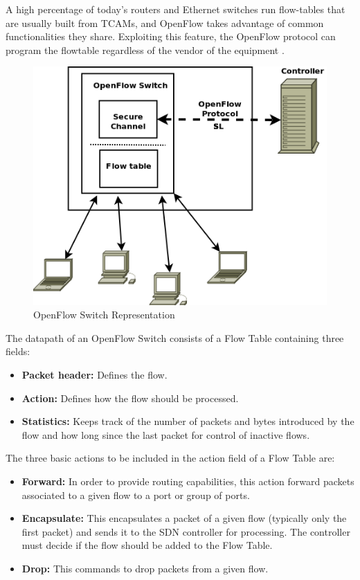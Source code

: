 A high percentage of today's routers and Ethernet switches run flow-tables that are usually built from TCAMs, and OpenFlow takes advantage of common functionalities they share. Exploiting this feature, the OpenFlow protocol can program the flowtable regardless of the vendor of the equipment \cite{of_campus_net}.

\begin{center}
\begin{figure}[h!]
  \centering
    \includegraphics[scale=0.55]{./images/OpenFlowSwitch}
	\caption{OpenFlow Switch Representation}
	\label{openflowswitch-fig}
\end{figure}
\end{center}

The datapath of an OpenFlow Switch consists of a Flow Table containing three fields:

\begin{itemize}
\item{\textbf{Packet header:} Defines the flow.}
\item{\textbf{Action:} Defines how the flow should be processed.} 
\item{\textbf{Statistics:} Keeps track of the number of packets and bytes introduced by the flow and how long since the last packet for control of inactive flows.}
\end{itemize}

The three basic actions to be included in the action field of a Flow Table are:

\begin{itemize}
\item{\textbf{Forward:} In order to provide routing capabilities, this action forward packets associated to a given flow to a port or group of ports.}
\item{\textbf{Encapsulate:} This encapsulates a packet of a given flow (typically only the first packet) and sends it to the SDN controller for processing. The controller must decide if the flow should be added to the Flow Table.} 
\item{\textbf{Drop:} This commands to drop packets from a given flow. }
\end{itemize}

